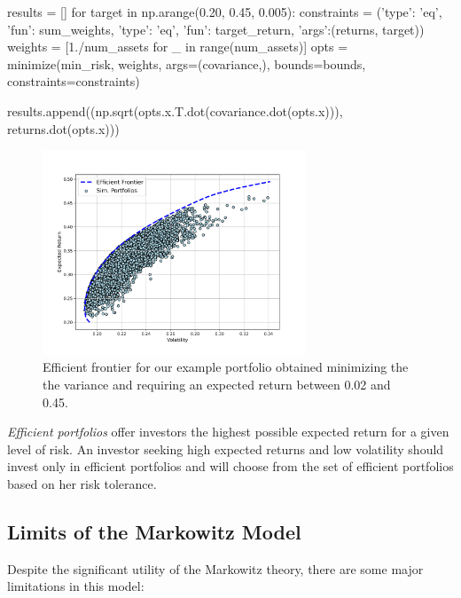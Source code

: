 \begin{ipython}
results = []    
for target in np.arange(0.20, 0.45, 0.005):
    constraints = ({'type': 'eq', 'fun': sum_weights},
                   {'type': 'eq', 'fun': target_return, 'args':(returns, target)})
    weights = [1./num_assets for _ in range(num_assets)]
    opts = minimize(min_risk, weights, args=(covariance,), 
                    bounds=bounds, constraints=constraints) 
    
    results.append((np.sqrt(opts.x.T.dot(covariance.dot(opts.x))),
                    returns.dot(opts.x))) 
\end{ipython}

\begin{figure}[htb]
\centering
\includegraphics[width=0.7\textwidth]{figures/efficient_frontier}
\caption{Efficient frontier for our example portfolio obtained minimizing the the variance and requiring an expected return between 0.02 and 0.45.}
\label{fig:efficient_frontier}
\end{figure}

\emph{Efficient portfolios} offer investors the highest possible expected return for a given level of risk. 
An investor seeking high expected returns and low volatility should invest only in efficient portfolios and will choose from the set of efficient portfolios based on her risk tolerance.
    
\subsection{Limits of the Markowitz Model}
\label{limits-of-the-markowitz-model}

Despite the significant utility of the Markowitz theory, there are some major limitations in this model:

